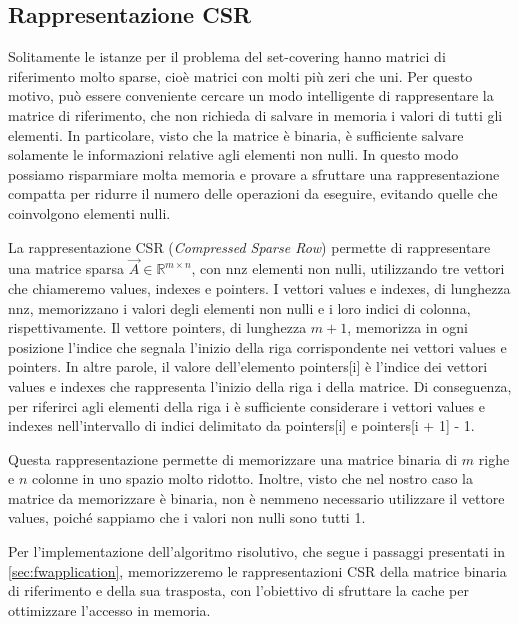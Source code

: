 \subsection{Rappresentazione CSR}
\label{sec:csr}

Solitamente le istanze per il problema del set-covering hanno matrici di riferimento molto sparse, cioè matrici con
molti più zeri che uni. Per questo motivo, può essere conveniente cercare un modo intelligente di rappresentare la
matrice di riferimento, che non richieda di salvare in memoria i valori di tutti gli elementi. In particolare, visto
che la matrice è binaria, è sufficiente salvare solamente le informazioni relative agli elementi non nulli. In questo
modo possiamo risparmiare molta memoria e provare a sfruttare una rappresentazione compatta per ridurre il numero delle
operazioni da eseguire, evitando quelle che coinvolgono elementi nulli.

La rappresentazione CSR (\textit{Compressed Sparse Row}) permette di rappresentare una matrice sparsa \( \vec{A} \in
\mathbb{R}^{m\times n}\), con {\jbm nnz} elementi non nulli, utilizzando tre vettori che chiameremo {\jbm values,
indexes} e {\jbm pointers}. I vettori {\jbm values} e {\jbm indexes}, di lunghezza {\jbm nnz}, memorizzano i valori
degli elementi non nulli e i loro indici di colonna, rispettivamente. Il vettore {\jbm pointers}, di lunghezza \( m + 1
\), memorizza in ogni posizione l'indice che segnala l'inizio della riga corrispondente nei vettori {\jbm values} e
{\jbm pointers}. In altre parole, il valore dell'elemento {\jbm pointers[i]} è l'indice dei vettori {\jbm values} e
{\jbm indexes} che rappresenta l'inizio della riga {\jbm i} della matrice. Di conseguenza, per riferirci agli elementi
della riga {\jbm i} è sufficiente considerare i vettori {\jbm values} e {\jbm indexes} nell'intervallo di indici
delimitato da {\jbm pointers[i]} e {\jbm pointers[i + 1] - 1}.

Questa rappresentazione permette di memorizzare una matrice binaria di \( m \) righe e \( n \) colonne in uno spazio
molto ridotto. Inoltre, visto che nel nostro caso la matrice da memorizzare è binaria, non è nemmeno necessario
utilizzare il vettore {\jbm values}, poiché sappiamo che i valori non nulli sono tutti 1.

Per l'implementazione dell'algoritmo risolutivo, che segue i passaggi presentati in \ref{sec:fwapplication},
memorizzeremo le rappresentazioni CSR della matrice binaria di riferimento e della sua trasposta, con l'obiettivo di
sfruttare la cache per ottimizzare l'accesso in memoria.
